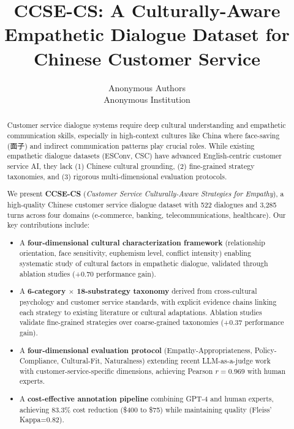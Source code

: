 \documentclass{article}
\title{CCSE-CS: A Culturally-Aware Empathetic Dialogue Dataset for Chinese Customer Service}
\author{
  Anonymous Authors \\
  Anonymous Institution
}
\begin{document}
\maketitle

\begin{abstract}
Customer service dialogue systems require deep cultural understanding and empathetic communication skills, especially in high-context cultures like China where face-saving (面子) and indirect communication patterns play crucial roles. While existing empathetic dialogue datasets (ESConv, CSC) have advanced English-centric customer service AI, they lack (1) Chinese cultural grounding, (2) fine-grained strategy taxonomies, and (3) rigorous multi-dimensional evaluation protocols.

We present \textbf{CCSE-CS} (\textit{Customer Service Culturally-Aware Strategies for Empathy}), a high-quality Chinese customer service dialogue dataset with 522 dialogues and 3,285 turns across four domains (e-commerce, banking, telecommunications, healthcare). Our key contributions include:

\begin{itemize}
  \item A \textbf{four-dimensional cultural characterization framework} (relationship orientation, face sensitivity, euphemism level, conflict intensity) enabling systematic study of cultural factors in empathetic dialogue, validated through ablation studies (+0.70 performance gain).

  \item A \textbf{6-category $\times$ 18-substrategy taxonomy} derived from cross-cultural psychology and customer service standards, with explicit evidence chains linking each strategy to existing literature or cultural adaptations. Ablation studies validate fine-grained strategies over coarse-grained taxonomies (+0.37 performance gain).

  \item A \textbf{four-dimensional evaluation protocol} (Empathy-Appropriateness, Policy-Compliance, Cultural-Fit, Naturalness) extending recent LLM-as-a-judge work with customer-service-specific dimensions, achieving Pearson \(r=0.969\) with human experts.

  \item A \textbf{cost-effective annotation pipeline} combining GPT-4 and human experts, achieving 83.3\% cost reduction (\$400 to \$75) while maintaining quality (Fleiss' Kappa=0.82).
\end{itemize}


\end{abstract}
\end{document}
